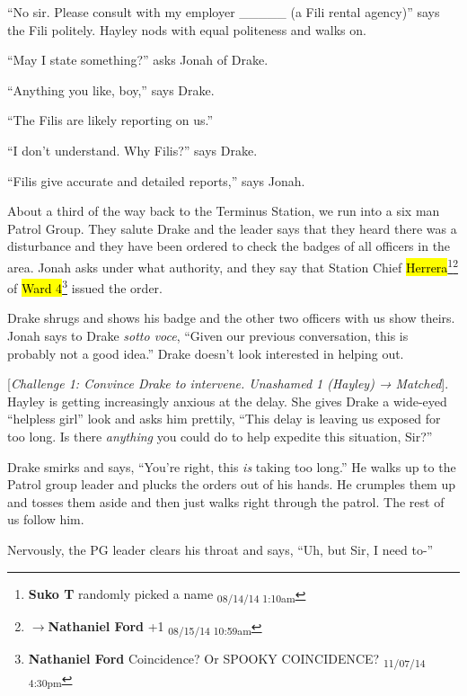 ``No sir.  Please consult with my employer \_\_\_\_\_ (a Fili rental agency)'' says the Fili politely.  Hayley nods with equal politeness and walks on.

``May I state something?'' asks Jonah of Drake.

``Anything you like, boy,'' says Drake.

``The Filis are likely reporting on us.''

``I don't understand.  Why Filis?'' says Drake.

``Filis give accurate and detailed reports,'' says Jonah.



About a third of the way back to the Terminus Station, we run into a six man Patrol Group.  They salute Drake and the leader says that they heard there was a disturbance and they have been ordered to check the badges of all officers in the area.   Jonah asks under what authority, and they say that Station Chief \hl{Herrera}\footnote{\textbf{Suko T }randomly picked a name \textsubscript{08/14/14 1:10am}}\footnote{$\rightarrow$\textbf{Nathaniel Ford }+1 \textsubscript{08/15/14 10:59am}} of \hl{Ward 4}\footnote{\textbf{Nathaniel Ford }Coincidence? Or SPOOKY COINCIDENCE? \textsubscript{11/07/14 4:30pm}} issued the order.



Drake shrugs and shows his badge and the other two officers with us show theirs.  Jonah says to Drake \textit{sotto voce}, ``Given our previous conversation, this is probably not a good idea.''  Drake doesn't look interested in helping out.  



{[}\textit{Challenge 1: Convince Drake to intervene.  Unashamed 1 (Hayley) → Matched}{]}.  Hayley is getting increasingly anxious at the delay.  She gives Drake a wide-eyed ``helpless girl'' look and asks him prettily, ``This delay is leaving us exposed for too long.  Is there \textit{anything} you could do to help expedite this situation, Sir?''



Drake smirks and says, ``You're right, this \textit{is} taking too long.''  He walks up to the Patrol group leader and plucks the orders out of his hands.  He crumples them up and tosses them aside and then just walks right through the patrol.  The rest of us follow him. 



Nervously, the PG leader clears his throat and says, ``Uh, but Sir, I need to-''


